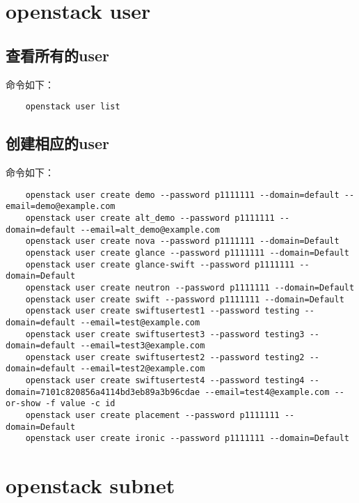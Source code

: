 \documentclass[a4paper,left=1.5cm,right=1.5cm,11pt]{article}
\begin{document}
\section{openstack user}
\subsection{查看所有的user}
	命令如下：
	\begin{lstlisting}
	openstack user list
	\end{lstlisting}

\subsection{创建相应的user}
	命令如下：
	\begin{lstlisting}
	openstack user create demo --password p1111111 --domain=default --email=demo@example.com
	openstack user create alt_demo --password p1111111 --domain=default --email=alt_demo@example.com
	openstack user create nova --password p1111111 --domain=Default
	openstack user create glance --password p1111111 --domain=Default
	openstack user create glance-swift --password p1111111 --domain=Default
	openstack user create neutron --password p1111111 --domain=Default
	openstack user create swift --password p1111111 --domain=Default
	openstack user create swiftusertest1 --password testing --domain=default --email=test@example.com
	openstack user create swiftusertest3 --password testing3 --domain=default --email=test3@example.com
	openstack user create swiftusertest2 --password testing2 --domain=default --email=test2@example.com
	openstack user create swiftusertest4 --password testing4 --domain=7101c820856a4114bd3eb89a3b96cdae --email=test4@example.com --or-show -f value -c id
	openstack user create placement --password p1111111 --domain=Default
	openstack user create ironic --password p1111111 --domain=Default
	\end{lstlisting}

\section{openstack subnet}
\end{document}
